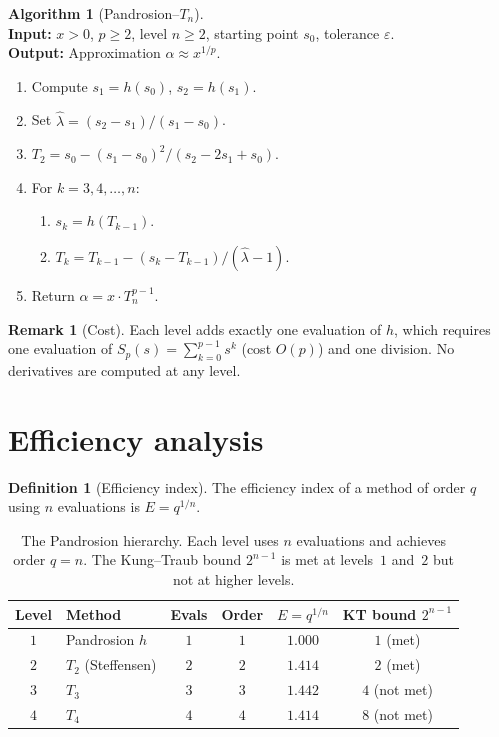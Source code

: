 \documentclass[11pt,a4paper]{article}
\theoremstyle{definition}
\newtheorem{definition}{Definition}[section]
\newtheorem{remark}{Remark}[section]
\newtheorem{algorithm_def}{Algorithm}[section]
\newcommand{\eps}{\varepsilon}
\begin{document}
\begin{algorithm_def}[Pandrosion--$T_n$]
\label{alg:full}
\mbox{}\\
\textbf{Input:} $x > 0$, $p \geq 2$, level $n \geq 2$, starting point $s_0$, tolerance $\eps$. \\
\textbf{Output:} Approximation $\alpha \approx x^{1/p}$.
\begin{enumerate}
  \item Compute $s_1 = h(s_0)$, $s_2 = h(s_1)$.
  \item Set $\hat\lambda = (s_2 - s_1)/(s_1 - s_0)$.
  \item $T_2 = s_0 - (s_1 - s_0)^2/(s_2 - 2s_1 + s_0)$.
  \item For $k = 3, 4, \ldots, n$:
  \begin{enumerate}
    \item $s_k = h(T_{k-1})$.
    \item $T_k = T_{k-1} - (s_k - T_{k-1})/(\hat\lambda - 1)$.
  \end{enumerate}
  \item Return $\alpha = x \cdot T_n^{p-1}$.
\end{enumerate}
\end{algorithm_def}

\begin{remark}[Cost]
Each level adds exactly one evaluation of $h$, which requires one evaluation of $S_p(s) = \sum_{k=0}^{p-1} s^k$ (cost $O(p)$) and one division.  No derivatives are computed at any level.
\end{remark}

\section{Efficiency analysis}
\label{sec:efficiency}

\begin{definition}[Efficiency index]
The efficiency index of a method of order $q$ using $n$ evaluations is $E = q^{1/n}$.
\end{definition}

\begin{table}[H]
\centering
\renewcommand{\arraystretch}{1.2}
\begin{tabular}{clcccc}
\toprule
\textbf{Level} & \textbf{Method} & \textbf{Evals} & \textbf{Order} & \textbf{$E = q^{1/n}$} & \textbf{KT bound $2^{n-1}$} \\
\midrule
$1$ & Pandrosion $h$ & $1$ & $1$ & $1.000$ & $1$ (met) \\
$2$ & $T_2$ (Steffensen) & $2$ & $2$ & $1.414$ & $2$ (met) \\
$3$ & $T_3$ & $3$ & $3$ & $1.442$ & $4$ (not met) \\
$4$ & $T_4$ & $4$ & $4$ & $1.414$ & $8$ (not met) \\
\bottomrule
\end{tabular}
\caption{The Pandrosion hierarchy.  Each level uses $n$ evaluations and achieves order $q = n$.  The Kung--Traub bound $2^{n-1}$ is met at levels~$1$ and~$2$ but not at higher levels.}
\label{tab:hierarchy}
\end{table}
\end{document}
